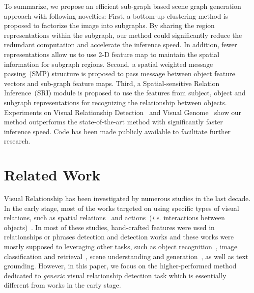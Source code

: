 \documentclass[runningheads]{llncs}
\newcommand{\ie}{\textit{i}.\textit{e}. }
\begin{document}
To summarize, we propose an efficient sub-graph based scene graph generation approach with following novelties: First, a bottom-up clustering method is proposed to factorize the image into subgraphs. By sharing the region representations within the subgraph, our method could significantly reduce the redundant computation and accelerate the inference speed. In addition, fewer representations allow us to use 2-D feature map to maintain the spatial information for subgraph regions. Second, a spatial weighted message passing~(SMP) structure is proposed to pass message between object feature vectors and sub-graph feature maps. Third, a Spatial-sensitive Relation Inference~(SRI) module is proposed to use the features from subject, object and subgraph representations for recognizing the relationship between objects. Experiments on Visual Relationship Detection~\cite{visual_relationship} and Visual Genome~\cite{visual_genome} show our method outperforms the state-of-the-art method with significantly faster inference speed. Code has been made publicly available to facilitate further research.

\section{Related Work}
Visual Relationship has been investigated by numerous studies in the last decade. In the early stage, most of the works targeted on using specific types of visual relations, such as spatial relations~\cite{gupta2008beyond, johnson2015image, galleguillos2008object, choi2013understanding, kulkarni2011baby, elliott2013image} and actions~(\ie interactions between objects)~\cite{yao2010grouplet, gkioxari2015contextual, regneri2013grounding, thomason2014integrating, ramanathan2015learning, rohrbach2013translating, guadarrama2013youtube2text, antol2014zero, elhoseiny2015sherlock, farhadi2010every,xiong2015recognize}.
In most of these studies, hand-crafted features were used in relationships or phrases detection and detection works and these works were mostly supposed to leveraging other tasks, such as
object recognition~\cite{galleguillos2010context, sivic2005discovering, kumar2010efficiently, choi2010exploiting, ladicky2010graph, salakhutdinov2011learning, rabinovich2007objects, fidler2007towards, russell2006using},
image classification and retrieval~\cite{mensink2014costa, gong2014multi},
scene understanding and generation~\cite{zitnick2013learning, hoiem2008putting, chang2014semantic, yao2012describing, izadinia2014incorporating, gould2008multi, berg2012understanding},
as well as text grounding\cite{plummer2015flickr30k, karpathy2014deep, rohrbach2015grounding}.
However, in this paper, we focus on the higher-performed method dedicated to \emph{generic} visual relationship detection task which is essentially different from  works in the early stage.
\end{document}
